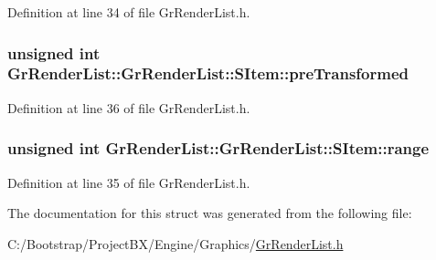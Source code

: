 Definition at line 34 of file GrRenderList.h.\hypertarget{struct_gr_render_list_1_1_s_item_2e41f93266e69ba59b799dbfebea3575}{
\subsubsection[{preTransformed}]{\setlength{\rightskip}{0pt plus 5cm}unsigned int GrRenderList::GrRenderList::SItem::preTransformed}}
\label{struct_gr_render_list_1_1_s_item_2e41f93266e69ba59b799dbfebea3575}




Definition at line 36 of file GrRenderList.h.\hypertarget{struct_gr_render_list_1_1_s_item_4585412be0e3084c369d507382bbe941}{
\subsubsection[{range}]{\setlength{\rightskip}{0pt plus 5cm}unsigned int {\bf GrRenderList::GrRenderList::SItem::range}}}
\label{struct_gr_render_list_1_1_s_item_4585412be0e3084c369d507382bbe941}




Definition at line 35 of file GrRenderList.h.

The documentation for this struct was generated from the following file:\begin{CompactItemize}
\item 
C:/Bootstrap/ProjectBX/Engine/Graphics/\hyperlink{_gr_render_list_8h}{GrRenderList.h}\end{CompactItemize}
